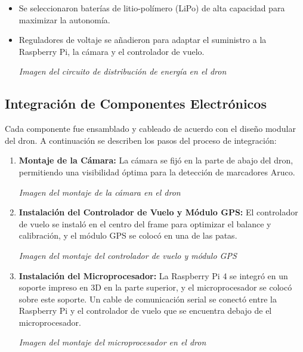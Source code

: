     \begin{itemize} 
        \item Se seleccionaron baterías de litio-polímero (LiPo) de alta capacidad para maximizar la autonomía. 
        \item Reguladores de voltaje se añadieron para adaptar el suministro a la Raspberry Pi, la cámara y el controlador de vuelo. 
        \begin{center} 
            \textit{Imagen del circuito de distribución de energía en el dron} 
        \end{center} 
    \end{itemize}

    \subsection{Integración de Componentes Electrónicos} Cada componente fue ensamblado y cableado de acuerdo con el diseño modular del dron. A continuación se describen los pasos del proceso de integración:

    \begin{enumerate} 
        \item \textbf{Montaje de la Cámara:} La cámara se fijó en la parte de abajo del dron, permitiendo una visibilidad óptima para la detección de marcadores Aruco. 
            \begin{center} 
                \textit{Imagen del montaje de la cámara en el dron} 
            \end{center} 
        \item \textbf{Instalación del Controlador de Vuelo y Módulo GPS:} El controlador de vuelo se instaló en el centro del frame para optimizar el balance y calibración, y el módulo GPS se colocó en una de las patas. 
            \begin{center} 
                \textit{Imagen del montaje del controlador de vuelo y módulo GPS} 
            \end{center} 
        \item \textbf{Instalación del Microprocesador:} La Raspberry Pi 4 se integró en un soporte impreso en 3D en la parte superior, y el microprocesador se colocó sobre este soporte. Un cable de comunicación serial se conectó entre la Raspberry Pi y el controlador de vuelo que se encuentra debajo de el microprocesador.
            \begin{center} 
                \textit{Imagen del montaje del microprocesador en el dron} 
            \end{center} 
    \end{enumerate}

